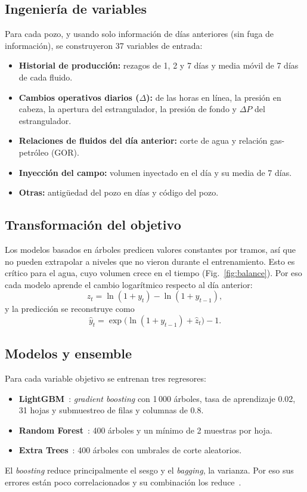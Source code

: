 \documentclass[journal]{IEEEtran}
\begin{document}
\subsection{Ingeniería de variables}
Para cada pozo, y usando solo información de días anteriores (sin fuga de información), se construyeron 37 variables de entrada:
\begin{itemize}
\item \textbf{Historial de producción:} rezagos de 1, 2 y 7 días y media móvil de 7 días de cada fluido.
\item \textbf{Cambios operativos diarios ($\Delta$):} de las horas en línea, la presión en cabeza, la apertura del estrangulador, la presión de fondo y $\Delta P$ del estrangulador.
\item \textbf{Relaciones de fluidos del día anterior:} corte de agua y relación gas-petróleo (GOR).
\item \textbf{Inyección del campo:} volumen inyectado en el día y su media de 7 días.
\item \textbf{Otras:} antigüedad del pozo en días y código del pozo.
\end{itemize}

\subsection{Transformación del objetivo}
Los modelos basados en árboles predicen valores constantes por tramos, así que no pueden extrapolar a niveles que no vieron durante el entrenamiento. Esto es crítico para el agua, cuyo volumen crece en el tiempo (Fig.~\ref{fig:balance}). Por eso cada modelo aprende el cambio logarítmico respecto al día anterior:
\begin{equation}
z_t = \ln(1+y_t) - \ln(1+y_{t-1}),
\end{equation}
y la predicción se reconstruye como
\begin{equation}
\hat{y}_t = \exp\!\big(\ln(1+y_{t-1}) + \hat{z}_t\big) - 1 .
\end{equation}

\subsection{Modelos y ensemble}
Para cada variable objetivo se entrenan tres regresores:
\begin{itemize}
\item \textbf{LightGBM}~\cite{lightgbm}: \textit{gradient boosting} con 1\,000 árboles, tasa de aprendizaje 0.02, 31 hojas y submuestreo de filas y columnas de 0.8.
\item \textbf{Random Forest}~\cite{breiman}: 400 árboles y un mínimo de 2 muestras por hoja.
\item \textbf{Extra Trees}~\cite{extratrees}: 400 árboles con umbrales de corte aleatorios.
\end{itemize}
El \emph{boosting} reduce principalmente el sesgo y el \emph{bagging}, la varianza. Por eso sus errores están poco correlacionados y su combinación los reduce~\cite{dietterich}.
\end{document}

